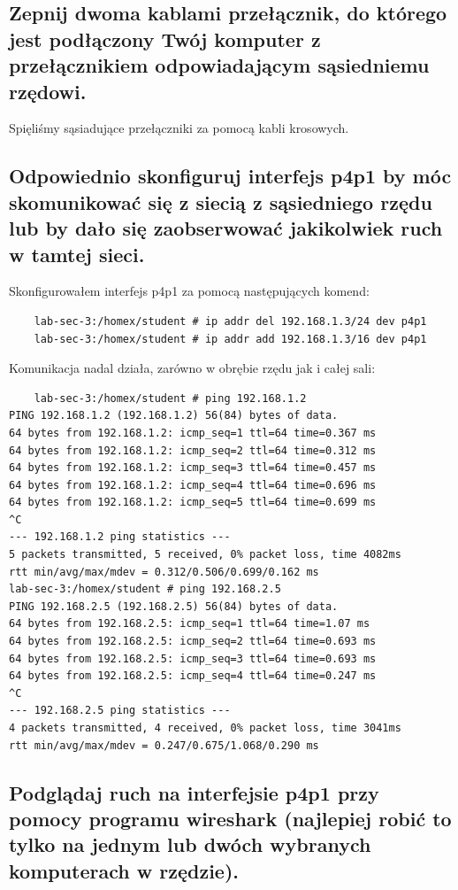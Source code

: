 \documentclass[polish, a4paper]{article}
\begin{document}
\subsection{Zepnij dwoma kablami przełącznik, do którego jest
podłączony Twój komputer z przełącznikiem odpowiadającym
sąsiedniemu rzędowi.}

Spięliśmy sąsiadujące przełączniki za pomocą kabli krosowych.

\subsection{Odpowiednio skonfiguruj interfejs p4p1 by móc skomunikować
się z siecią z sąsiedniego rzędu lub by dało się zaobserwować
jakikolwiek ruch w tamtej sieci.}

Skonfigurowałem interfejs p4p1 za pomocą następujących komend:

\begin{verbatim}
    lab-sec-3:/homex/student # ip addr del 192.168.1.3/24 dev p4p1
    lab-sec-3:/homex/student # ip addr add 192.168.1.3/16 dev p4p1
\end{verbatim}

Komunikacja nadal działa, zarówno w obrębie rzędu jak i całej sali:
\begin{verbatim}
    lab-sec-3:/homex/student # ping 192.168.1.2
PING 192.168.1.2 (192.168.1.2) 56(84) bytes of data.
64 bytes from 192.168.1.2: icmp_seq=1 ttl=64 time=0.367 ms
64 bytes from 192.168.1.2: icmp_seq=2 ttl=64 time=0.312 ms
64 bytes from 192.168.1.2: icmp_seq=3 ttl=64 time=0.457 ms
64 bytes from 192.168.1.2: icmp_seq=4 ttl=64 time=0.696 ms
64 bytes from 192.168.1.2: icmp_seq=5 ttl=64 time=0.699 ms
^C
--- 192.168.1.2 ping statistics ---
5 packets transmitted, 5 received, 0% packet loss, time 4082ms
rtt min/avg/max/mdev = 0.312/0.506/0.699/0.162 ms
lab-sec-3:/homex/student # ping 192.168.2.5
PING 192.168.2.5 (192.168.2.5) 56(84) bytes of data.
64 bytes from 192.168.2.5: icmp_seq=1 ttl=64 time=1.07 ms
64 bytes from 192.168.2.5: icmp_seq=2 ttl=64 time=0.693 ms
64 bytes from 192.168.2.5: icmp_seq=3 ttl=64 time=0.693 ms
64 bytes from 192.168.2.5: icmp_seq=4 ttl=64 time=0.247 ms
^C
--- 192.168.2.5 ping statistics ---
4 packets transmitted, 4 received, 0% packet loss, time 3041ms
rtt min/avg/max/mdev = 0.247/0.675/1.068/0.290 ms
\end{verbatim}

\subsection{Podglądaj ruch na interfejsie p4p1 przy pomocy programu
wireshark (najlepiej robić to tylko na jednym lub dwóch
wybranych komputerach w rzędzie).}
\end{document}

